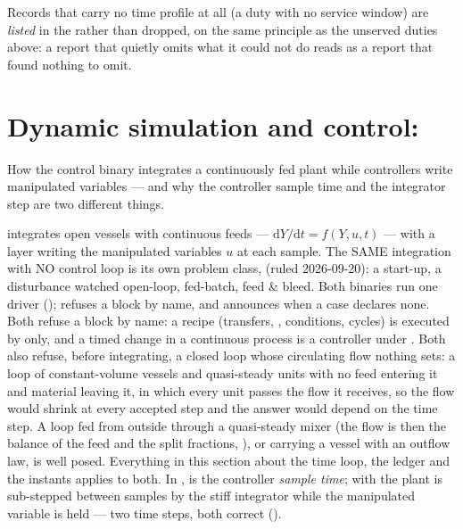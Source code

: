 \documentclass[11pt,a4paper]{article}
\begin{document}
Records that carry no time profile at all (a duty with no service window)
are \emph{listed} in the  rather than dropped, on the same
principle as the unserved duties above: a report that quietly omits what it
could not do reads as a report that found nothing to omit.

\section{Dynamic simulation and control: }\label{sec:ctrl}

\begin{whatyoulllearn}
How the control binary integrates a continuously fed plant while
controllers write manipulated variables --- and why the controller
sample time and the integrator step are two different things.
\end{whatyoulllearn}

 integrates open vessels with continuous feeds ---
$\mathrm{d}Y/\mathrm{d}t = f(Y, u, t)$ --- with a 
layer writing the manipulated variables $u$ at each sample.  The SAME
integration with NO control loop is its own problem class,
 (ruled 2026-09-20): a start-up, a disturbance
watched open-loop, fed-batch, feed \& bleed.  Both binaries run one driver
();  refuses a
 block by name, and  announces when a case
declares none.  Both refuse a  block by name: a recipe
(transfers, , conditions, cycles) is executed by
 only, and a timed change in a continuous process is a
 controller under .  Both also refuse,
before integrating, a closed loop whose circulating flow nothing sets: a loop
of constant-volume vessels and quasi-steady units with no feed entering it and
material leaving it, in which every unit passes the flow it receives, so the
flow would shrink at every accepted step and the answer would depend on the time
step.  A loop fed from outside through a quasi-steady mixer (the flow is then
the balance of the feed and the split fractions, ),
or carrying a vessel with an outflow law, is well posed.  Everything in this
section about the time loop, the ledger and the instants applies to both.  In
,  is the controller \emph{sample time};
with  the plant is sub-stepped between
samples by the stiff integrator while the manipulated variable is held
--- two time steps, both correct
().
\end{document}
